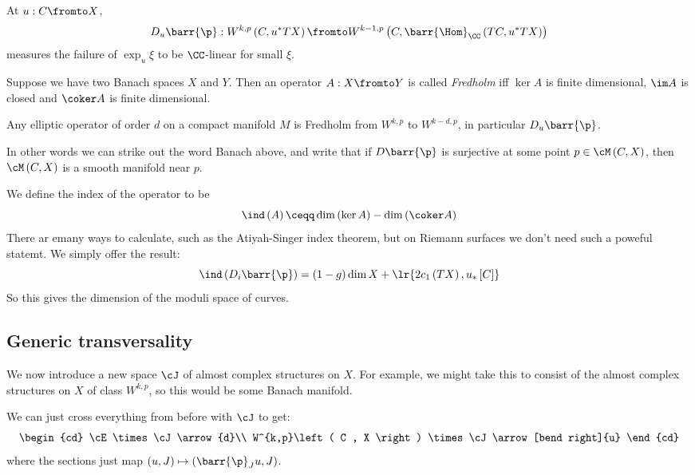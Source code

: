\documentclass{amsart}
\begin{document}
At $u:C\fromto X$, 
\begin{equation}
D_u \barr{\p}:
W^{k,p}\left( C , u^* TX \right)\fromto 
W^{k-1 , p}\left( C , \barr{\Hom}_\CC\left( TC , u^* TX \right) \right)
\end{equation}
measures the failure of $\exp_u \xi$ to be $\CC$-linear for small $\xi$.

\begin{defn}
Suppose we have two Banach spaces $X$ and $Y$.
Then an operator $A:X\fromto Y$ is called \emph{Fredholm} iff
$\ker A$ is finite dimensional, $\im A$ is closed and $\coker A$ is finite dimensional.
\end{defn}

\begin{thm}
Any elliptic operator of order $d$ on a compact manifold $M$ is Fredholm from
$W^{k,p}$ to $W^{k-d , p}$, in particular $D_u \barr{\p}$.
\end{thm}

In other words we can strike out the word Banach above, and write that
if $D\barr{\p}$ is surjective at some point $p\in \cM\left( C , X \right)$, 
then $\cM\left( C , X \right)$ is a smooth manifold near $p$.

We define the index of the operator to be
\begin{equation}
\ind\left( A \right) \ceqq \dim\left( \ker A \right) - \dim\left( \coker A \right)
\end{equation}
There ar emany ways to calculate, such as the Atiyah-Singer index theorem, 
but on Riemann surfaces we don't need such a poweful statemt.
We simply offer the result:
\begin{equation}
\ind\left( D_i \barr{\p} \right) = 
\left( 1 - g \right)\dim X+ \lr{2c_1\left( TX \right) , u_*\left[ C \right]}
\end{equation}
So this gives the dimension of the moduli space of curves.

\subsection{Generic transversality}

We now introduce a new space $\cJ$ of almost complex structures on $X$.
For example, we might take this to consist of the almost complex structures on $X$
of class $W^{k,p}$, so this would be some Banach manifold.

We can just cross everything from before with $\cJ$ to get:
\begin{equation}
\begin{cd}
\cE\times \cJ \arrow{d}\\
W^{k,p}\left( C , X \right) \times \cJ\arrow[bend right]{u}
\end{cd}
\end{equation}
where the sections just map $\left( u,J \right) \mapsto \left( \barr{\p}_J u , J \right)$.
\end{document}
